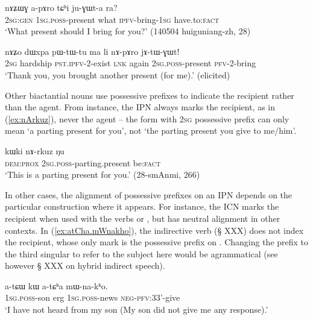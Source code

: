 \begin{exe}
\ex \label{ex:apAro}
\gll nɤʑɯɣ a-pɤro tɕʰi ju-ɣɯt-a ra? \\
\textsc{2sg:gen} \textsc{1sg}.\textsc{poss}-present what \textsc{ipfv}-bring-\textsc{1sg} have.to:\textsc{fact} \\
\glt `What present should I bring for you?' (140504 huiguniang-zh, 28)
\end{exe}

\begin{exe}
\ex \label{ex:nApAro}
\gll nɤʑo dɯxpa pɯ-tɯ-tu ma li nɤ-pɤro jɤ-tɯ-ɣɯt! \\
\textsc{2sg} hardship \textsc{pst}.\textsc{ipfv}-2-exist \textsc{lnk} again \textsc{2sg}.\textsc{poss}-present \textsc{pfv}-2-bring \\
\glt `Thank you, you brought another present (for me).' (elicited)
\end{exe}

Other biactantial nouns use possessive prefixes to indicate the recipient rather than the agent. From instance, the IPN  always marks the recipient, as in (\ref{ex:nArkuz}), never the agent -- the form  with \textsc{2sg} possessive prefix can only mean `a parting present for you', not `the parting present you give to me/him'.

\begin{exe}
\ex \label{ex:nArkuz}
\gll  kɯki nɤ-rkuz ŋu \\
\textsc{dem}:\textsc{prox} \textsc{2sg}.\textsc{poss}-parting.present be:\textsc{fact} \\
\glt `This is a parting present for you.' (28-smAnmi, 266)
\end{exe}

In other cases, the alignment of possessive prefixes on an IPN depends on the  particular construction where it appears. For instance, the ICN  marks the recipient when used with the verbs  or , but has neutral alignment in other contexts. In (\ref{ex:atCha.mWnakho}), the indirective verb  (§ XXX) does not index the recipient, whose only mark is the possessive prefix on . Changing the prefix to the third singular  to refer to the subject here would be agrammatical (see however § XXX on hybrid indirect speech).


\begin{exe}
\ex \label{ex:atCha.mWnakho}
\gll  a-tɕɯ kɯ a-tɕʰa mɯ-na-kʰo. \\
\textsc{1sg}.\textsc{poss}-son erg \textsc{1sg}.\textsc{poss}-news \textsc{neg}-\textsc{pfv}:3\fl{}3'-give \\
\glt `I have not heard from my son (My son did not give me any response).' 
\end{exe}

